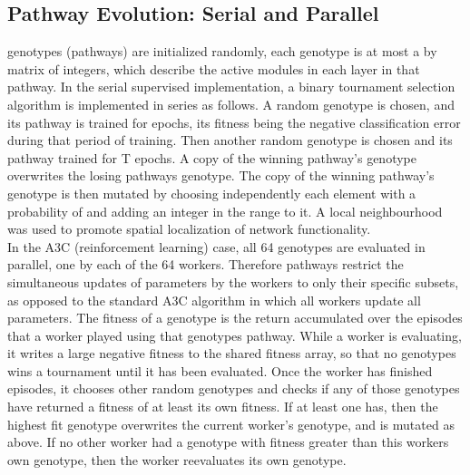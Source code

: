 \documentclass{sig-alternate-05-2015}
\begin{document}
\subsection{Pathway Evolution: Serial and Parallel} 
 genotypes (pathways) are initialized randomly, each genotype is at most a  by  matrix of integers, which describe the active modules in each layer in that pathway. In the serial supervised implementation, a binary tournament selection algorithm is implemented in series as follows. A random genotype is chosen, and its pathway is trained for  epochs, its fitness being the negative classification error during that period of training. Then another random genotype is chosen and its pathway trained for T epochs. A copy of the winning pathway's genotype overwrites the losing pathways genotype. The copy of the winning pathway's genotype is then mutated by choosing independently each element with a probability of  and adding an integer in the range  to it.  A local neighbourhood was used to promote spatial localization of network functionality. \\

In the A3C (reinforcement learning) case, all 64 genotypes are evaluated in parallel, one by each of the 64 workers. Therefore pathways restrict the simultaneous updates of parameters by the workers to only their specific subsets, as opposed to the standard A3C algorithm in which all workers update all parameters. The fitness of a genotype is the return accumulated over the  episodes that a worker played using that genotypes pathway. While a worker is evaluating, it writes a large negative fitness to the shared fitness array, so that no genotypes wins a tournament until it has been evaluated. Once the worker has finished  episodes, it chooses  other random genotypes and checks if any of those genotypes have returned a fitness of at least its own fitness. If at least one has, then the highest fit genotype overwrites the current worker's genotype, and is mutated as above.  If no other worker had a genotype with fitness greater than this workers own genotype, then the worker reevaluates its own genotype. 
\end{document}

